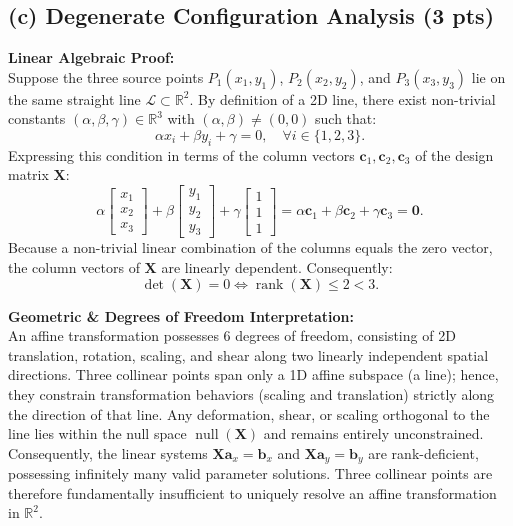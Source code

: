 \documentclass[11pt,a4paper]{article}
\begin{document}
\subsection{(c) Degenerate Configuration Analysis (3 pts)}
\noindent\textbf{Linear Algebraic Proof:}\\
Suppose the three source points $P_1(x_1, y_1)$, $P_2(x_2, y_2)$, and $P_3(x_3, y_3)$ lie on the same straight line $\mathcal{L} \subset \mathbb{R}^2$. By definition of a 2D line, there exist non-trivial constants $(\alpha, \beta, \gamma) \in \mathbb{R}^3$ with $(\alpha, \beta) \neq (0, 0)$ such that:
\begin{equation}
\alpha x_i + \beta y_i + \gamma = 0, \quad \forall i \in \{1, 2, 3\}.
\end{equation}
Expressing this condition in terms of the column vectors $\mathbf{c}_1, \mathbf{c}_2, \mathbf{c}_3$ of the design matrix $\mathbf{X}$:
\begin{equation}
\alpha \begin{bmatrix} x_1 \\ x_2 \\ x_3 \end{bmatrix} + \beta \begin{bmatrix} y_1 \\ y_2 \\ y_3 \end{bmatrix} + \gamma \begin{bmatrix} 1 \\ 1 \\ 1 \end{bmatrix} = \alpha \mathbf{c}_1 + \beta \mathbf{c}_2 + \gamma \mathbf{c}_3 = \mathbf{0}.
\end{equation}
Because a non-trivial linear combination of the columns equals the zero vector, the column vectors of $\mathbf{X}$ are linearly dependent. Consequently:
\begin{equation}
\det(\mathbf{X}) = 0 \iff \operatorname{rank}(\mathbf{X}) \le 2 < 3.
\end{equation}

\noindent\textbf{Geometric \& Degrees of Freedom Interpretation:}\\
An affine transformation possesses 6 degrees of freedom, consisting of 2D translation, rotation, scaling, and shear along two linearly independent spatial directions. Three collinear points span only a 1D affine subspace (a line); hence, they constrain transformation behaviors (scaling and translation) strictly along the direction of that line. Any deformation, shear, or scaling orthogonal to the line lies within the null space $\operatorname{null}(\mathbf{X})$ and remains entirely unconstrained. Consequently, the linear systems $\mathbf{X} \mathbf{a}_x = \mathbf{b}_x$ and $\mathbf{X} \mathbf{a}_y = \mathbf{b}_y$ are rank-deficient, possessing infinitely many valid parameter solutions. Three collinear points are therefore fundamentally insufficient to uniquely resolve an affine transformation in $\mathbb{R}^2$.
\end{document}
